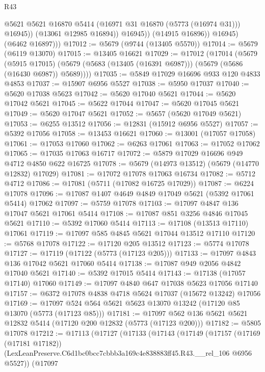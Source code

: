 \begin{lexlean}{R43}
\begin{coremodule}
                      @5621
                      @5621
                      @16870
                      @5414
                      (@16971 @31 @16870 (@5773 (@16974 @31)))
                      @16945))
                  (@13061 @12985 @16894))
                @16945))
            (@14915 @16896))
          @16945)
        (@6462 @16897)))
@17012 := @5679 (@9744 (@13405 @5570))
@17014 := @5679 (@6119 @13070)
@17015 := @13405 @16621
@17029 := @17012
    (@17014
      (@5679
        (@5915 @17015)
        (@5679 (@5683 (@13405 (@16391 @6987))) (@5679 (@5686 (@16430 @6987)) @5689))))
@17035 := @5849 @17029 @16696 @933 @120 @4833 @4853
@17037 := @15907 @6956 @5527
@17038 := @5950 @17037
@17040 := @5620 @17038 @5623
@17042 := @5620 @17040 @5621
@17044 := @5620 @17042 @5621
@17045 := @5622 @17044
@17047 := @5620 @17045 @5621
@17049 := @5620 @17047 @5621
@17052 := @5657 (@5620 @17049 @5621)
@17053 := @6255 @13512
@17056 := @12831 (@15912 @6956 @5527)
@17057 := @5392 @17056
@17058 := @13453 @16621
@17060 := @13001 (@17057 @17058)
@17061 := @17053 @17060
@17062 := @6263 @17061
@17063 := @17052 @17062
@17065 := @17035 @17063 @16717
@17072 := @5879 @17029 @16696 @949 @4712 @4850 @622 @16725
@17078 := @5679 (@14973 @13512) (@5679 (@14770 @12832) @17029)
@17081 := @17072 @17078 @17063 @16734
@17082 := @5712 @4712
@17086 := @17081 (@5711 (@17082 @16725 @17029))
@17087 := @6224 @17078
@17096 := @17087 @1407 @4649 @4849 @17049 @5621 (@5392 @17061 @5414) @17062
@17097 := @5759 @17078
@17103 := @17097 @4847 @136 @17047 @5621 @17061 @5414
@17108 := @17087 @851 @3256 @4846 @17045 @5621
@17110 := @5392 @17060 @5414
@17113 := @17108 (@13513 @17110) @17061
@17119 := @17097 @585 @4845 @5621 @17044 @13512 @17110
@17120 := @5768 @17078
@17122 := @17120 @205 @13512
@17123 := @5774 @17078
@17127 := @17119 (@17122 (@5773 (@17123 @205)))
@17133 := @17097 @4843 @136 @17042 @5621 @17060 @5414
@17138 := @17087 @949 @2056 @4842 @17040 @5621
@17140 := @5392 @17015 @5414
@17143 := @17138 (@17057 @17140) @17060
@17149 := @17097 @4840 @647 @17038 @5623 @17056 @17140
@17157 := @6372 @17078 @4838 @4718 @5624 @17037 (@15672 @13242) @17056
@17169 := @17097 @524 @564 @5621 @5623 @13070 @13242 (@17120 @85 @13070 (@5773 (@17123 @85)))
@17181 := @17097 @562 @136 @5621 @5621 @12832 @5414 (@17120 @200 @12832 (@5773 (@17123 @200)))
@17182 := @5805 @17078
@17212 := @17113
    (@17127
      (@17133
        (@17143
          (@17149
            (@17157
              (@17169 (@17181 @17182))
              (LexLeanPreserve.C6d1bc0bcc7cbbb3a169c4e838883ff45.R43.__rel_106 @6956 @5527))
            (@17097

\end{coremodule}
\end{lexlean}
